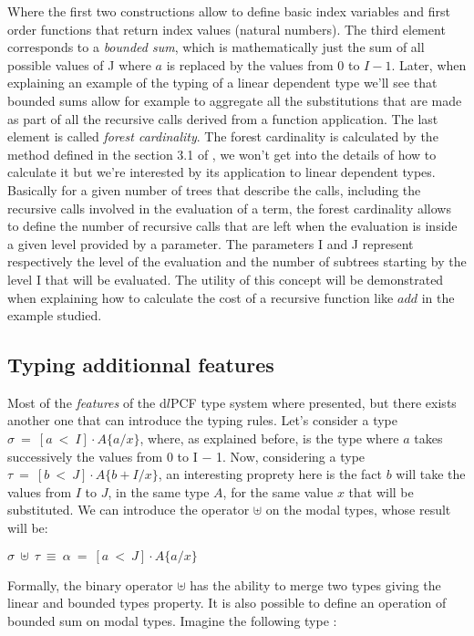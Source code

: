 \documentclass[a4paper,12pt]{article}
\begin{document}
Where the first two constructions allow to define basic index variables and first order
functions that return index values (natural numbers). The third element corresponds to
a \emph{bounded sum}, which is mathematically just the sum of all possible values of J 
where $a$ is replaced by the values from 0 to $I-1$. Later, when explaining an example 
of the typing of a linear dependent type we'll see that bounded sums allow for example to 
aggregate all the substitutions that are made as part of all the recursive calls derived
from a function application. The last element is called \emph{forest cardinality}. The forest
cardinality is calculated by the method defined in the section 3.1 of \cite{ldtcv}, we won't
get into the details of how to calculate it but we're interested by its application to 
linear dependent types. Basically for a given number of trees that describe the calls, including
the recursive calls involved in the evaluation of a term, the forest cardinality allows to
define the number of recursive calls that are left when the evaluation is inside a given
level provided by a parameter. The parameters I and J represent respectively the level of the 
evaluation and the number of subtrees starting by the level I that will be evaluated. The 
utility of this concept will be demonstrated when explaining how to calculate the cost of
a recursive function like $add$ in the example studied.

\subsection{Typing additionnal features}


Most of the \emph{features} of the d$l$PCF type system where presented, but
there exists another one that can introduce the typing rules. Let's consider a
type $\sigma~=~[a~<~I] \cdot A\{a/x\}$, where, as explained before, is the type
where $a$ takes successively the values from 0 to I $-$ 1. Now, considering a
type $\tau~=~[b~<~J] \cdot A\{b+I/x\}$, an interesting proprety here is the fact
$b$ will take the values from $I$ to $J$, in the same type $A$, for the same value
$x$ that will be substituted. We can introduce the operator $\uplus$ on the
modal types, whose result will be:

\begin{center}
$\sigma~\uplus~\tau~\equiv~\alpha~=~[a~<~J] \cdot A\{a/x\}$
\end{center}

Formally, the binary operator $\uplus$ has the ability to merge two types giving
the linear and bounded types property. It is also possible to define an
operation of bounded sum on modal types. Imagine the following type :
\end{document}
